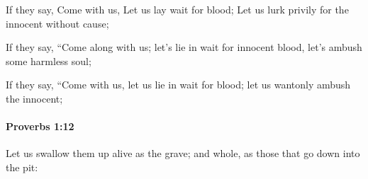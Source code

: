 			\begin{versebox}
					\item[BHS] 
					\item[ASV] If they say, Come with us, Let us lay wait for blood; Let us lurk privily for the innocent without cause;
					\item[NIV] If they say, “Come along with us; let’s lie in wait for innocent blood, let’s ambush some harmless soul;
					\item[NRSV] If they say, “Come with us, let us lie in wait for blood; let us wantonly ambush the innocent;
			\end{versebox}

		\paragraph{Proverbs 1:12} %
			\label{PROVERBS-1-12}

			Let us swallow them up alive as the grave; and whole, as those that go down into the pit:

